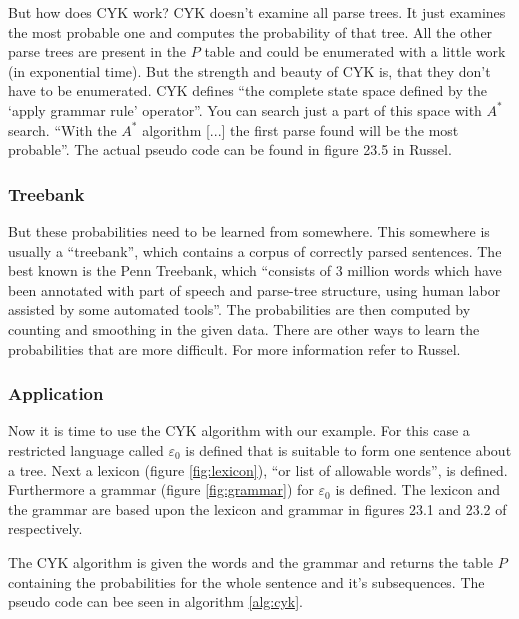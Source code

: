 \documentclass[12pt,twoside]{scrartcl}
\theoremstyle{plain}
\theoremstyle{definition}
\theoremstyle{remark}
\begin{document}
		But how does CYK work? CYK doesn't examine all parse trees. It just examines the most probable one and computes the probability of that tree. All the other parse trees are present in the $P$ table and could be enumerated with a little work (in exponential time). But the strength and beauty of CYK is, that they don't have to be enumerated. CYK defines ``the complete state space defined by the `apply grammar rule' operator''\cite[p.~894]{Russel2010}. You can search just a part of this space with $A^{*}$ search.\cite{Russel2010} ``With the $A^{*}$ algorithm [...] the first parse found will be the most probable''\cite[p.~895]{Russel2010}. The actual pseudo code can be found in figure 23.5 in Russel\cite[p.~894]{Russel2010}.
		
		\subsubsection*{Treebank}
		\label{subSubSec:treebank}
		
		But these probabilities need to be learned from somewhere. This somewhere is usually a ``treebank''\cite[p.~895]{Russel2010}, which contains a corpus of correctly parsed sentences. The best known is the Penn Treebank\cite{Russel2010}, which ``consists of 3 million words which have been annotated with part of speech and parse-tree structure, using human labor assisted by some automated tools''\cite[p.~895]{Russel2010}. The probabilities are then computed by counting and smoothing in the given data.\cite{Russel2010} There are other ways to learn the probabilities that are more difficult. For more information refer to Russel\cite{Russel2010}.
		
		\subsubsection*{Application}
		\label{subSubSec:application}
		
		Now it is time to use the CYK algorithm with our example. For this case a restricted language called $\varepsilon_{0}$ is defined that is suitable to form one sentence about a tree. Next a lexicon (figure \ref{fig:lexicon}), ``or list of allowable words''\cite[p.~890]{Russel2010}, is defined. Furthermore a grammar (figure \ref{fig:grammar}) for $\varepsilon_{0}$ is defined. The lexicon and the grammar are based upon the lexicon and grammar in figures 23.1 and 23.2 of \cite{Russel2010} respectively.
		
		The CYK algorithm is given the words and the grammar and returns the table $P$ containing the probabilities for the whole sentence and it's subsequences.\cite{Russel2010} The pseudo code can bee seen in algorithm \ref{alg:cyk}.
		
\end{document}
